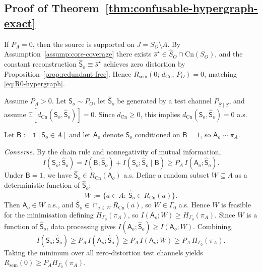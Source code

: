 \documentclass[journal,onecolumn]{IEEEtran}
\makeatletter
\newcommand{\Cn}{\text{Cn}}
\numberwithin{equation}{section}
\renewenvironment{proof}[1][\proofname]{\par
  \pushQED{\qed}%
  \normalfont \topsep6\p@\@plus6\p@\relax
  \trivlist
  \item[\hskip\labelsep
        \itshape
    #1\@addpunct{.}]\ignorespaces
}{%
  \popQED\endtrivlist\@endpefalse
}
\makeatother
\begin{document}
\subsection{Proof of Theorem~\ref{thm:confusable-hypergraph-exact}}
\label{app:proof-confusable-hypergraph-exact}

\begin{proof}
If \(P_A=0\), then the source is supported on \(J=S_O\setminus A\).
By Assumption~\ref{assump:core-coverage} there exists
\(\hat s^\star\in\hat S_O\cap\Cn(S_O)\), and the constant reconstruction
\(\hat{\mathsf{S}}_o\equiv \hat s^\star\) achieves zero distortion by
Proposition~\ref{prop:redundant-free}. Hence
\(R_{\mathrm{sem}}(0;\,d_{\Cn},\,P_O)=0\), matching
\eqref{eq:R0-hypergraph}.

Assume \(P_A>0\).
Let \(\mathsf{S}_o\sim P_O\), let \(\hat{\mathsf{S}}_o\) be generated by a
test channel \(P_{\hat S\mid S}\), and assume
\(\mathbb{E}[d_{\Cn}(\mathsf{S}_o,\hat{\mathsf{S}}_o)]=0\).
Since \(d_{\Cn}\ge 0\), this implies \(d_{\Cn}(\mathsf{S}_o,\hat{\mathsf{S}}_o)=0\) a.s.

Let \(\mathsf{B}:=\mathbf{1}[\mathsf{S}_o\in A]\) and let \(\mathsf{A}_o\) denote
\(\mathsf{S}_o\) conditioned on \(\mathsf{B}=1\), so \(\mathsf{A}_o\sim\pi_A\).

\smallskip\noindent
\emph{Converse.}
By the chain rule and nonnegativity of mutual information,
\[
  I(\mathsf{S}_o;\hat{\mathsf{S}}_o)
  =
  I(\mathsf{B};\hat{\mathsf{S}}_o)+I(\mathsf{S}_o;\hat{\mathsf{S}}_o\mid \mathsf{B})
  \ge
  P_A\,I(\mathsf{A}_o;\hat{\mathsf{S}}_o).
\]
Under \(\mathsf{B}=1\), we have \(\hat{\mathsf{S}}_o\in R_{\Cn}(\mathsf{A}_o)\) a.s.
Define a random subset \(W\subseteq A\) as a deterministic function of \(\hat{\mathsf{S}}_o\):
\[
  W:=\{a\in A:\ \hat{\mathsf{S}}_o\in R_{\Cn}(a)\}.
\]
Then \(\mathsf{A}_o\in W\) a.s., and \(\hat{\mathsf{S}}_o\in\cap_{a\in W}R_{\Cn}(a)\),
so \(W\in\Gamma_0\) a.s.
Hence \(W\) is feasible for the minimisation defining \(H_{\Gamma_0}(\pi_A)\), so
\(I(\mathsf{A}_o;W)\ge H_{\Gamma_0}(\pi_A)\).
Since \(W\) is a function of \(\hat{\mathsf{S}}_o\), data processing gives
\(I(\mathsf{A}_o;\hat{\mathsf{S}}_o)\ge I(\mathsf{A}_o;W)\).
Combining,
\[
  I(\mathsf{S}_o;\hat{\mathsf{S}}_o)
  \ge
  P_A\,I(\mathsf{A}_o;\hat{\mathsf{S}}_o)
  \ge
  P_A\,I(\mathsf{A}_o;W)
  \ge
  P_A\,H_{\Gamma_0}(\pi_A).
\]
Taking the minimum over all zero-distortion test channels yields
\(R_{\mathrm{sem}}(0)\ge P_A H_{\Gamma_0}(\pi_A)\).


\end{proof}
\end{document}
